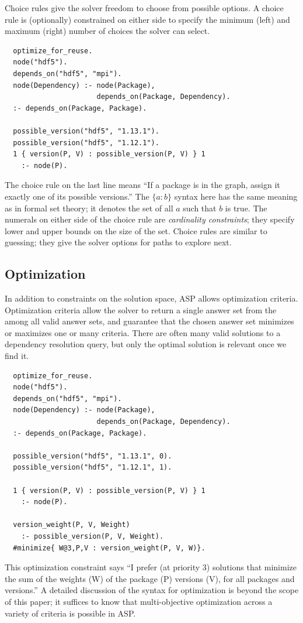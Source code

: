 Choice rules give the solver freedom to choose from possible options. A choice rule is
(optionally) constrained on either side to specify the minimum (left) and maximum
(right) number of choices the solver can select.
\begin{verbatim}
  optimize_for_reuse.
  node("hdf5").
  depends_on("hdf5", "mpi").
  node(Dependency) :- node(Package),
                      depends_on(Package, Dependency).
  :- depends_on(Package, Package).

  possible_version("hdf5", "1.13.1").
  possible_version("hdf5", "1.12.1").
  1 { version(P, V) : possible_version(P, V) } 1
    :- node(P).
\end{verbatim}
The choice rule on the last line means ``If a package is in the graph, assign it
exactly one of its possible versions.'' The $\{a:b\}$ syntax here has the same meaning
as in formal set theory; it denotes the set of all $a$ such that $b$ is true. The
numerals on either side of the choice rule are {\it cardinality constraints}; they specify
lower and upper bounds on the size of the set. Choice rules are similar to guessing;
they give the solver options for paths to explore next.


\subsection{Optimization}

In addition to constraints on the solution space, ASP allows optimization criteria.
Optimization criteria allow the solver to return a single answer set from the among all
valid answer sets, and guarantee that the chosen answer set minimizes or maximizes one
or many criteria. There are often many valid solutions to a dependency resolution query,
but only the optimal solution is relevant once we find it.
\begin{verbatim}
  optimize_for_reuse.
  node("hdf5").
  depends_on("hdf5", "mpi").
  node(Dependency) :- node(Package),
                      depends_on(Package, Dependency).
  :- depends_on(Package, Package).

  possible_version("hdf5", "1.13.1", 0).
  possible_version("hdf5", "1.12.1", 1).

  1 { version(P, V) : possible_version(P, V) } 1
    :- node(P).

  version_weight(P, V, Weight)
    :- possible_version(P, V, Weight).
  #minimize{ W@3,P,V : version_weight(P, V, W)}.
\end{verbatim}
This optimization constraint says ``I prefer (at priority 3) solutions that minimize the
sum of the weights (W) of the package (P) versions (V), for all packages and versions.''
A detailed discussion of the syntax for optimization is beyond the scope of this paper;
it suffices to know that multi-objective optimization across a variety of criteria is
possible in ASP.

